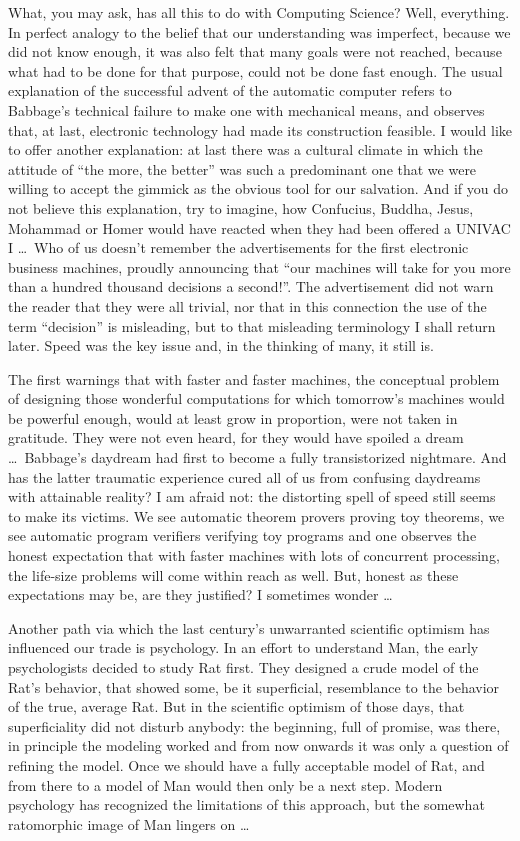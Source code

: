 \documentclass[12pt,letterpaper]{article}
\newcommand{\acro}[1]{{\small\MakeUppercase{#1}\spacefactor1000}}
\begin{document}
What, you may ask, has all this to do with Computing Science? Well, everything.
In perfect analogy to the belief that our understanding was imperfect, because
we did not know enough, it was also felt that many goals were not reached,
because what had to be done for that purpose, could not be done fast enough.
The usual explanation of the successful advent of the automatic computer refers
to Babbage's technical failure to make one with mechanical means, and observes
that, at last, electronic technology had made its construction feasible. I
would like to offer another explanation: at last there was a cultural climate
in which the attitude of ``the more, the better'' was such a predominant one
that we were willing to accept the gimmick as the obvious tool for our
salvation. And if you do not believe this explanation, try to imagine, how
Confucius, Buddha, Jesus, Mohammad or Homer would have reacted when they had
been offered a \acro{UNIVAC I} \ldots\ Who of us doesn't remember the
advertisements for the first electronic business machines, proudly announcing
that ``our machines will take for you more than a hundred thousand decisions a
second!''. The advertisement did not warn the reader that they were all
trivial, nor that in this connection the use of the term ``decision'' is
misleading, but to that misleading terminology I shall return later. Speed was
the key issue and, in the thinking of many, it still is. 

The first warnings that with faster and faster machines, the conceptual problem
of designing those wonderful computations for which tomorrow's machines would
be powerful enough, would at least grow in proportion, were not taken in
gratitude. They were not even heard, for they would have spoiled a dream
\ldots\ Babbage's daydream had first to become a fully transistorized
nightmare. And has the latter traumatic experience cured all of us from
confusing daydreams with attainable reality? I am afraid not: the distorting
spell of speed still seems to make its victims. We see automatic theorem
provers proving toy theorems, we see automatic program verifiers verifying toy
programs and one observes the honest expectation that with faster machines with
lots of concurrent processing, the life-size problems will come within reach as
well. But, honest as these expectations may be, are they justified? I sometimes
wonder \ldots

Another path via which the last century's unwarranted scientific optimism has
influenced our trade is psychology. In an effort to understand Man, the early
psychologists decided to study Rat first. They designed a crude model of the
Rat's behavior, that showed some, be it superficial, resemblance to the
behavior of the true, average Rat. But in the scientific optimism of those
days, that superficiality did not disturb anybody: the beginning, full of
promise, was there, in principle the modeling worked and from now onwards it
was only a question of refining the model. Once we should have a fully
acceptable model of Rat, and from there to a model of Man would then only be a
next step. Modern psychology has recognized the limitations of this approach,
but the somewhat ratomorphic image of Man lingers on \ldots 
\end{document}
